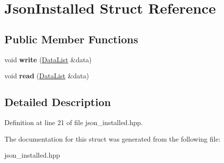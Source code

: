 \hypertarget{struct_json_installed}{\section{Json\-Installed Struct Reference}
\label{struct_json_installed}
}
\subsection*{Public Member Functions}
\begin{DoxyCompactItemize}
\item 
\hypertarget{struct_json_installed_ab43b0de0bcdbe5ddf56b621e97c62274}{void {\bfseries write} (\hyperlink{struct_data_list}{Data\-List} \&data)}\label{struct_json_installed_ab43b0de0bcdbe5ddf56b621e97c62274}

\item 
\hypertarget{struct_json_installed_ab2bfcfc2831a7e089b42f9abbe7d1d93}{void {\bfseries read} (\hyperlink{struct_data_list}{Data\-List} \&data)}\label{struct_json_installed_ab2bfcfc2831a7e089b42f9abbe7d1d93}

\end{DoxyCompactItemize}


\subsection{Detailed Description}


Definition at line 21 of file json\-\_\-installed.\-hpp.



The documentation for this struct was generated from the following file\-:\begin{DoxyCompactItemize}
\item 
json\-\_\-installed.\-hpp\end{DoxyCompactItemize}
